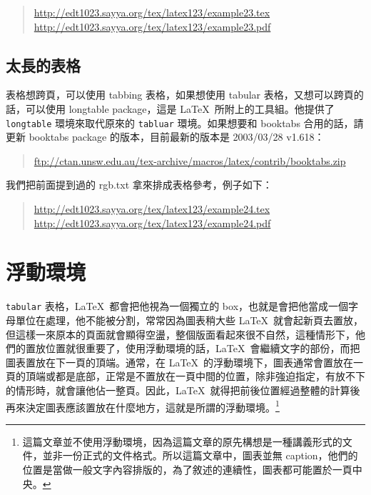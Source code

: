 \begin{quote}
  \url{http://edt1023.sayya.org/tex/latex123/example23.tex}\\
  \url{http://edt1023.sayya.org/tex/latex123/example23.pdf}
\end{quote}

\subsection{太長的表格}

表格想跨頁，可以使用 {\ttfamily tabbing} 表格，如果想使用 {\ttfamily tabular} 表格，又想可以跨頁的話，可以使用 {\sffamily longtable} package，這是 \LaTeX\ 所附上的工具組。他提供了 \texttt{longtable} 環境來取代原來的 \texttt{tabluar} 環境。如果想要和 \textsf{booktabs} 合用的話，請更新 \textsf{booktabs} package 的版本，目前最新的版本是 2003/03/28 v1.618：

\begin{quote}
  \url{ftp://ctan.unsw.edu.au/tex-archive/macros/latex/contrib/booktabs.zip}
\end{quote}

我們把前面提到過的 {\ttfamily rgb.txt} 拿來排成表格參考，例子如下：

\begin{quote}
  \url{http://edt1023.sayya.org/tex/latex123/example24.tex}\\
  \url{http://edt1023.sayya.org/tex/latex123/example24.pdf}
\end{quote}

\section{浮動環境}
\label{sec:float}

\texttt{tabular} 表格，\LaTeX\ 都會把他視為一個獨立的 box，也就是會把他當成一個字母單位在處理，他不能被分割，常常因為圖表稍大些 \LaTeX\ 就會起新頁去置放，但這樣一來原本的頁面就會顯得空盪，整個版面看起來很不自然，這種情形下，他們的置放位置就很重要了，使用浮動環境的話，\LaTeX\ 會繼續文字的部份，而把圖表置放在下一頁的頂端。通常，在 \LaTeX\ 的浮動環境下，圖表通常會置放在一頁的頂端或都是底部，正常是不置放在一頁中間的位置，除非強迫指定，有放不下的情形時，就會讓他佔一整頁。因此，\LaTeX\ 就得把前後位置經過整體的計算後再來決定圖表應該置放在什麼地方，這就是所謂的浮動環境。\footnote{這篇文章並不使用浮動環境，因為這篇文章的原先構想是一種講義形式的文件，並非一份正式的文件格式。所以這篇文章中，圖表並無 caption，他們的位置是當做一般文字內容排版的，為了敘述的連續性，圖表都可能置於一頁中央。}

